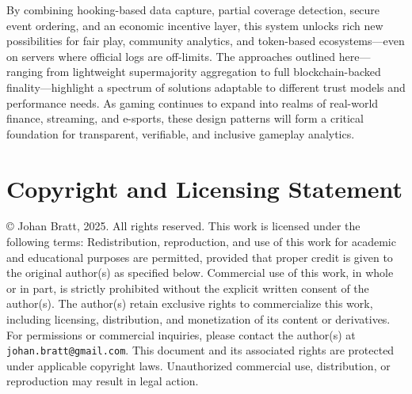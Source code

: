 \documentclass[11pt]{article}
\begin{document}
By combining hooking-based data capture, partial coverage detection, secure event ordering, and an economic incentive layer, this system unlocks rich new possibilities for fair play, community analytics, and token-based ecosystems—even on servers where official logs are off-limits. The approaches outlined here—ranging from lightweight supermajority aggregation to full blockchain-backed finality—highlight a spectrum of solutions adaptable to different trust models and performance needs. As gaming continues to expand into realms of real-world finance, streaming, and e-sports, these design patterns will form a critical foundation for transparent, verifiable, and inclusive gameplay analytics.



\section*{Copyright and Licensing Statement}
© Johan Bratt, 2025. All rights reserved. This work is licensed under the following terms: Redistribution, reproduction, and use of this work for academic and educational purposes are permitted, provided that proper credit is given to the original author(s) as specified below. Commercial use of this work, in whole or in part, is strictly prohibited without the explicit written consent of the author(s). The author(s) retain exclusive rights to commercialize this work, including licensing, distribution, and monetization of its content or derivatives. For permissions or commercial inquiries, please contact the author(s) at \texttt{johan.bratt@gmail.com}. This document and its associated rights are protected under applicable copyright laws. Unauthorized commercial use, distribution, or reproduction may result in legal action.
\end{document}
